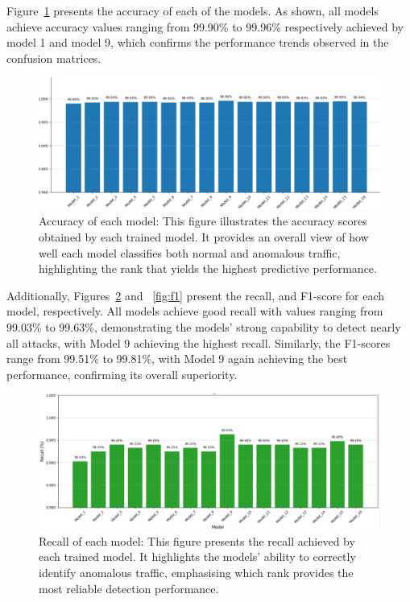 \documentclass[pdflatex,sn-mathphys-num]{sn-jnl}
\theoremstyle{thmstyleone}
\theoremstyle{thmstyletwo}
\theoremstyle{thmstylethree}
\begin{document}
 Figure~\ref{fig:accl} presents the accuracy of each of the models. As shown, all models achieve accuracy values ranging from 99.90\% to 99.96\% respectively achieved by model 1 and model 9, which confirms the performance trends observed in the confusion matrices.
\begin{figure}[H]
    \centering
    \includegraphics[width=1.1\linewidth]{accu.png}
    \caption{Accuracy of each model: This figure illustrates the accuracy scores obtained by each trained model. It provides an overall view of how well each model classifies both normal and anomalous traffic, highlighting the rank that yields the highest predictive performance.}
    \label{fig:accl}
\end{figure}
\noindent Additionally, Figures~\ref{fig:recall} and ~\ref{fig:f1} present the recall, and F1-score for each model, respectively. All models achieve good recall with values ranging from 99.03\% to 99.63\%, demonstrating the models’ strong capability to detect nearly all attacks, with Model 9 achieving the highest recall. Similarly, the F1-scores range from 99.51\% to 99.81\%, with Model 9 again achieving the best performance, confirming its overall superiority.

\begin{figure}[H]
    \centering
    \includegraphics[width=1.1\linewidth]{recall.png}
    \caption{Recall of each model: This figure presents the recall achieved by each trained model. It highlights the models’ ability to correctly identify anomalous traffic, emphasising which rank provides the most reliable detection performance.}
    \label{fig:recall}
\end{figure}
\end{document}
